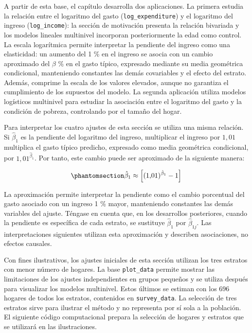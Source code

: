 \documentclass[
  spanish,
  11pt,
  letterpaper,
  oneside,
  open=any]{scrbook}
\begin{document}
A partir de esta base, el capítulo desarrolla dos aplicaciones. La
primera estudia la relación entre el logaritmo del gasto
(\texttt{log\_expenditure}) y el logaritmo del ingreso
(\texttt{log\_income}): la sección de motivación presenta la relación
bivariada y los modelos lineales multinivel incorporan posteriormente la
edad como control. La escala logarítmica permite interpretar la
pendiente del ingreso como una elasticidad: un aumento del 1 \% en el
ingreso se asocia con un cambio aproximado del \(\beta\) \% en el gasto
típico, expresado mediante su media geométrica condicional, manteniendo
constantes las demás covariables y el efecto del estrato. Además,
comprime la escala de los valores elevados, aunque no garantiza el
cumplimiento de los supuestos del modelo. La segunda aplicación utiliza
modelos logísticos multinivel para estudiar la asociación entre el
logaritmo del gasto y la condición de pobreza, controlando por el tamaño
del hogar.

Para interpretar los cuatro ajustes de esta sección se utiliza una misma
relación. Si \(\hat\beta_1\) es la pendiente del logaritmo del ingreso,
multiplicar el ingreso por \(1{,}01\) multiplica el gasto típico
predicho, expresado como media geométrica condicional, por
\(1{,}01^{\hat\beta_1}\). Por tanto, este cambio puede ser aproximado de
la siguiente manera:

\begin{equation}\protect\phantomsection\label{eq-motivacion-elasticidad-gasto}{
\hat{\beta}_{1} \approx \left[(1{,}01)^{\hat{\beta}_{1}} - 1\right]
}\end{equation}

La aproximación permite interpretar la pendiente como el cambio
porcentual del gasto asociado con un ingreso 1 \% mayor, manteniendo
constantes las demás variables del ajuste. Téngase en cuenta que, en los
desarrollos posteriores, cuando la pendiente es específica de cada
estrato, se sustituye \(\hat\beta_1\) por \(\hat\beta_{1j}\). Las
interpretaciones siguientes utilizan esta aproximación y describen
asociaciones, no efectos causales.

Con fines ilustrativos, los ajustes iniciales de esta sección utilizan
los tres estratos con menor número de hogares. La base
\texttt{plot\_data} permite mostrar las limitaciones de los ajustes
independientes en grupos pequeños y se utiliza después para visualizar
los modelos multinivel. Estos últimos se estiman con los 696 hogares de
todos los estratos, contenidos en \texttt{survey\_data}. La selección de
tres estratos sirve para ilustrar el método y no representa por sí sola
a la población. El siguiente código computacional prepara la selección
de hogares y estratos que se utilizará en las ilustraciones.
\end{document}
